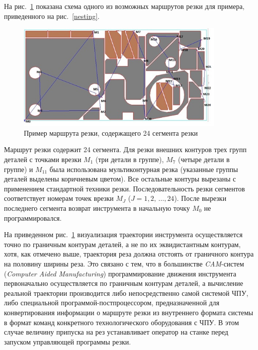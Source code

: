 \documentclass[11pt,twoside,openany]{report}
\begin{document}
На рис.~\ref{cutting}
показана схема одного из возможных маршрутов резки для примера,
приведенного на рис.~\ref{nesting}.

\begin{figure}[h]
  \begin{center}
  \includegraphics[width=0.9\textwidth]{cutting.png}
  \caption{Пример маршрута резки, содержащего 24 сегмента резки}
  \label{cutting}
  \end{center}
\end{figure}

Маршрут резки содержит 24 сегмента.
Для резки внешних контуров трех групп деталей
с точками врезки $M_1$
(три детали в группе),
$M_7$
(четыре детали в группе) и
$M_{11}$
была использована мультиконтурная резка
(указанные группы деталей выделены коричневым цветом).
Все остальные контуры вырезаны с применением стандартной техники резки.
Последовательность резки сегментов соответствует
номерам точек врезки $M_J$ ($J=1,2,\,\dots, 24$).
После вырезки последнего сегмента
возврат инструмента в начальную точку $M_0$
не программировался.

На приведенном рис.~\ref{cutting}
визуализация траектории инструмента
осуществляется точно по граничным контурам деталей,
а не по их эквидистантным контурам, хотя,
как отмечено выше,
траектория реза должна отстоять от
граничного контура на половину ширины реза.
Это связано с тем, что в большинстве
\textit{CAM}-систем
(\textit{Computer Aided Manufacturing})
программирование движения инструмента первоначально
осуществляется по граничным контурам деталей,
а вычисление реальной траектории производится
либо непосредственно самой системой ЧПУ,
либо специальной программой-постпроцессором,
предназначенной для конвертирования информации о
маршруте резки из внутреннего формата системы в
формат команд конкретного технологического оборудования с ЧПУ.
В этом случае величину припуска на рез
устанавливает оператор на станке перед запуском
управляющей программы резки.
\end{document}

